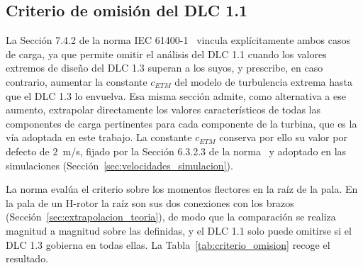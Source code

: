 \subsection{Criterio de omisión del DLC 1.1}
\label{sec:criterio_omision}

La Sección 7.4.2 de la norma IEC 61400-1~\parencite*{IEC61400-1} vincula explícitamente ambos casos de carga, ya que permite omitir el análisis del DLC 1.1 cuando los valores extremos de diseño del DLC 1.3 superan a los suyos, y prescribe, en caso contrario, aumentar la constante $c_{ETM}$ del modelo de turbulencia extrema hasta que el DLC 1.3 lo envuelva. Esa misma sección admite, como alternativa a ese aumento, extrapolar directamente los valores característicos de todas las componentes de carga pertinentes para cada componente de la turbina, que es la vía adoptada en este trabajo. La constante $c_{ETM}$ conserva por ello su valor por defecto de $2$~m/s, fijado por la Sección 6.3.2.3 de la norma~\parencite{IEC61400-1} y adoptado en las simulaciones (Sección~\ref{sec:velocidades_simulacion}).

La norma evalúa el criterio sobre los momentos flectores en la raíz de la pala. En la pala de un H-rotor la raíz son sus dos conexiones con los brazos (Sección~\ref{sec:extrapolacion_teoria}), de modo que la comparación se realiza magnitud a magnitud sobre las definidas, y el DLC 1.1 solo puede omitirse si el DLC 1.3 gobierna en todas ellas. La Tabla~\ref{tab:criterio_omision} recoge el resultado.

